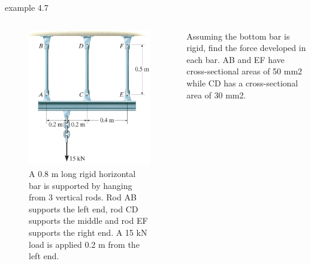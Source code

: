 \documentclass[
  letterpaper,
  ignorenonframetext,
  aspectratio=43,
  handout,
  12pt]{beamer}
\let\Oldincludegraphics\includegraphics
\renewcommand{\includegraphics}[2][]{\Oldincludegraphics[width=\textwidth,height=0.7\textheight,keepaspectratio]{#2}}
\begin{document}
\begin{frame}{example 4.7}
\protect\hypertarget{example-4.7}{}
\begin{columns}[T]
\begin{column}{0.5\textwidth}
\begin{figure}
\centering
\includegraphics{../images/example-4-7.jpg}
\caption{A 0.8 m long rigid horizontal bar is supported by hanging from
3 vertical rods. Rod AB supports the left end, rod CD supports the
middle and rod EF supports the right end. A 15 kN load is applied 0.2 m
from the left end.}
\end{figure}
\end{column}

\begin{column}{0.5\textwidth}
Assuming the bottom bar is rigid, find the force developed in each bar.
AB and EF have cross-sectional areas of 50 mm2 while CD has a
cross-sectional area of 30 mm2.
\end{column}
\end{columns}
\end{frame}
\end{document}
